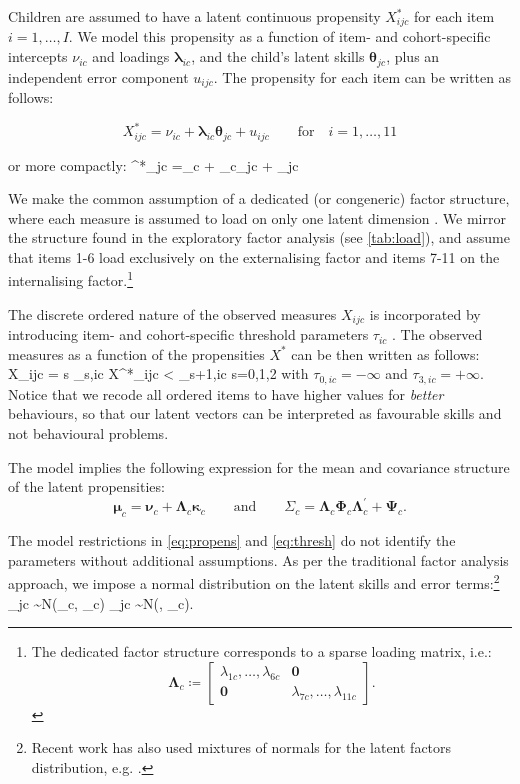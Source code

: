 Children are assumed to have a latent continuous propensity $X^*_{ijc}$ for each item $i=1,\dots,I$. We model this propensity as a function of item- and cohort-specific intercepts $\nu_{ic}$ and loadings $\bm{\lambda}_{ic}$, and the child's latent skills $\bm{\theta}_{jc}$, plus an independent error component $u_{ijc}$. The propensity for each item can be written as follows:

$$X^*_{ijc} =\nu_{ic} + \bm{\lambda}_{ic}\bm{\theta}_{jc} + u_{ijc} \qquad \text{for} \quad i = 1,\dots,11$$

or more compactly:
\be\label{eq:propens}
^*_{jc} =\bm{\nu}_c + \bm{\Lambda}_{c}\bm{\theta}_{jc} + _{jc}
\ee

We make the common assumption of a dedicated (or congeneric) factor structure, where each measure is assumed to load on only one latent dimension \citep{Heckman2013,conti2010education,Attanasio2017c}. We mirror the structure found in the exploratory factor analysis (see \autoref{tab:load}), and assume that items 1-6 load exclusively on the externalising factor and items 7-11 on the internalising factor.\footnote{The dedicated factor structure corresponds to a sparse loading matrix, i.e.: $$\bm{\Lambda}_{c} \coloneqq \begin{bmatrix} \lambda_{1c}, \dots, \lambda_{6c} & \bm{0} \\ \bm{0} & \lambda_{7c}, \dots, \lambda_{11c} \end{bmatrix}.$$}

The discrete ordered nature of the observed measures $X_{ijc}$ is incorporated by introducing item- and cohort-specific threshold parameters $\tau_{ic}$ \citep{Muthen1984}. The observed measures as a function of the propensities $X^*$ can be then written as follows:
\be\label{eq:thresh}
X_{ijc} = s \qquad {} \; \tau_{s,ic} \leq X^*_{ijc} < \tau_{s+1,ic} \qquad {} \; s=0,1,2
\ee
with $\tau_{0,ic}=-\infty$ and $\tau_{3,ic}=+\infty$. Notice that we recode all ordered items to have higher values for \emph{better} behaviours, so that our latent vectors can be interpreted as favourable skills and not behavioural problems.

The model implies the following expression for the mean and covariance structure of the latent propensities:
$$\bm{\mu}_c=\bm{\nu}_c + \bm{\Lambda}_c\bm{\kappa}_c \qquad \text{and} \qquad \Sigma_c = \bm{\Lambda}_c \bm{\Phi}_c \bm{\Lambda}_c^\prime + \bm{\Psi}_c.$$

The model restrictions in \eqref{eq:propens} and \eqref{eq:thresh} do not identify the parameters without additional assumptions. As per the traditional factor analysis approach, we impose a normal distribution on the latent skills and error terms:\footnote{Recent work has also used mixtures of normals for the latent factors distribution, e.g. \citet{conti2010education}.}
\be\label{eq:norm}
\bm{\theta}_{jc} \sim N(\bm{\kappa}_c, \bm{\Phi}_c) \qquad {} \qquad {}_{jc} \sim N(, \bm{\Psi}_c).
\ee


